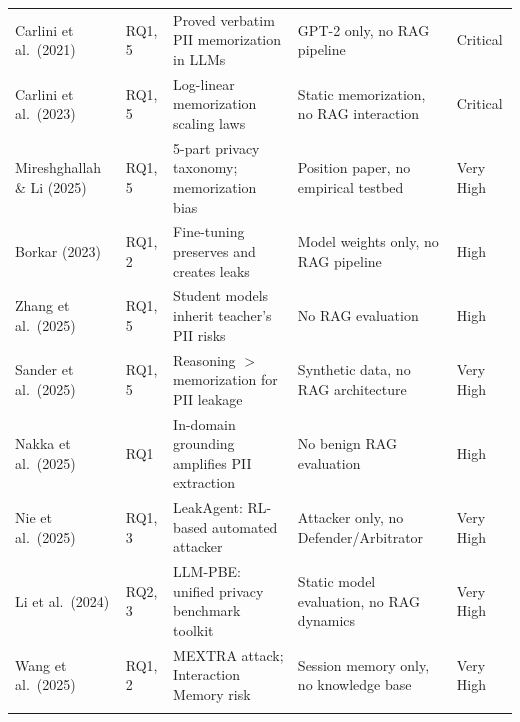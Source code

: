\documentclass[12pt, a4paper]{report}
\begin{document}
\begin{small}
\begin{longtable}{L{3cm} C{1.2cm} L{3.5cm} L{3.5cm} C{1.5cm}}
\midrule
{}
 \\
\midrule

Carlini et al.\ (2021) & RQ1, 5 & Proved verbatim PII memorization in LLMs & GPT-2 only, no RAG pipeline & Critical \\
Carlini et al.\ (2023) & RQ1, 5 & Log-linear memorization scaling laws & Static memorization, no RAG interaction & Critical \\
Mireshghallah \& Li (2025) & RQ1, 5 & 5-part privacy taxonomy; memorization bias & Position paper, no empirical testbed & Very High \\
Borkar (2023) & RQ1, 2 & Fine-tuning preserves and creates leaks & Model weights only, no RAG pipeline & High \\
Zhang et al.\ (2025) & RQ1, 5 & Student models inherit teacher's PII risks & No RAG evaluation & High \\
Sander et al.\ (2025) & RQ1, 5 & Reasoning $>$ memorization for PII leakage & Synthetic data, no RAG architecture & Very High \\
Nakka et al.\ (2025) & RQ1 & In-domain grounding amplifies PII extraction & No benign RAG evaluation & High \\
Nie et al.\ (2025) & RQ1, 3 & LeakAgent: RL-based automated attacker & Attacker only, no Defender/Arbitrator & Very High \\
Li et al.\ (2024) & RQ2, 3 & LLM-PBE: unified privacy benchmark toolkit & Static model evaluation, no RAG dynamics & Very High \\
Wang et al.\ (2025) & RQ1, 2 & MEXTRA attack; Interaction Memory risk & Session memory only, no knowledge base & Very High \\

\midrule
{}
 \\
\midrule


\end{longtable}
\end{small}
\end{document}
